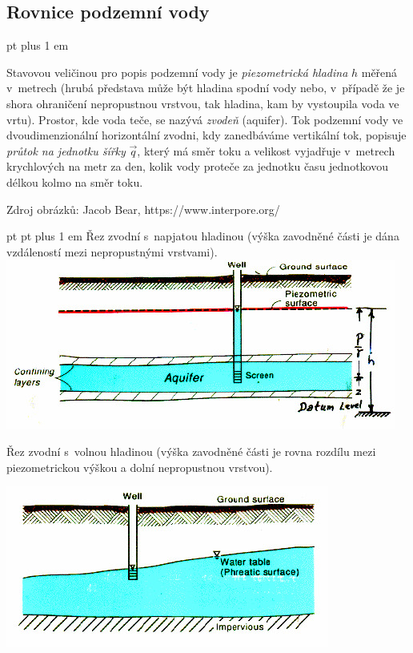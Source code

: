 \subsection{Rovnice podzemní vody}
\def\raggedright{ pt plus 1 em}
\begin{minipage}[t]{0.44\linewidth}\raggedright
   
  Stavovou veličinou pro popis podzemní vody je \textit{piezometrická
    hladina} $h$ měřená v metrech (hrubá představa může být hladina
  spodní vody nebo, v případě že je shora ohraničení nepropustnou
  vrstvou, tak hladina, kam by vystoupila voda ve vrtu). Prostor, kde
  voda teče, se nazývá \textit{zvodeň} (aquifer). Tok podzemní vody ve
  dvoudimenzionální horizontální zvodni, kdy zanedbáváme vertikální
  tok, popisuje \textit{průtok na jednotku šířky} $\vec q$, který má směr toku
  a velikost vyjadřuje v metrech krychlových na metr za den, kolik
  vody proteče za jednotku času jednotkovou délkou kolmo na směr toku.

\bigskip
Zdroj obrázků: Jacob Bear, https://www.interpore.org/

\end{minipage}\hfill
\begin{minipage}[t]{0.5\linewidth}
   pt
  \raggedright
  Řez zvodní s napjatou hladinou (výška zavodněné části je dána vzdáleností mezi nepropustnými vrstvami).
\includegraphics[width=0.99\linewidth]{conaq.jpg}

  Řez zvodní s volnou hladinou (výška zavodněné části je rovna rozdílu mezi piezometrickou výškou a dolní nepropustnou vrstvou).

\includegraphics[width=0.99\linewidth]{phraq.jpg}
  
\end{minipage}


